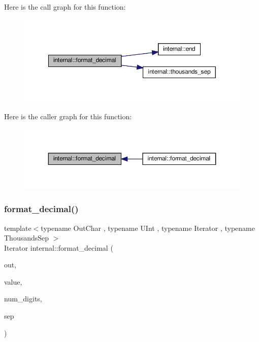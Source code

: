 Here is the call graph for this function\+:
\nopagebreak
\begin{figure}[H]
\begin{center}
\leavevmode
\includegraphics[width=350pt]{namespaceinternal_a40361ef75be4acee6abc19730bdb54e3_cgraph}
\end{center}
\end{figure}
Here is the caller graph for this function\+:
\nopagebreak
\begin{figure}[H]
\begin{center}
\leavevmode
\includegraphics[width=350pt]{namespaceinternal_a40361ef75be4acee6abc19730bdb54e3_icgraph}
\end{center}
\end{figure}
\mbox{\label{namespaceinternal_a4a9acc87fcfbaaceb13bd64a92c866ed}} 
\subsubsection{\texorpdfstring{format\+\_\+decimal()}{format\_decimal()}\hspace{0.1cm}{\footnotesize\ttfamily [2/3]}}
{\footnotesize\ttfamily template$<$typename Out\+Char , typename U\+Int , typename Iterator , typename Thousands\+Sep $>$ \\
Iterator internal\+::format\+\_\+decimal (\begin{DoxyParamCaption}\item[{Iterator}]{out,  }\item[{U\+Int}]{value,  }\item[{int}]{num\+\_\+digits,  }\item[{Thousands\+Sep}]{sep }\end{DoxyParamCaption})\hspace{0.3cm}{\ttfamily [inline]}}



